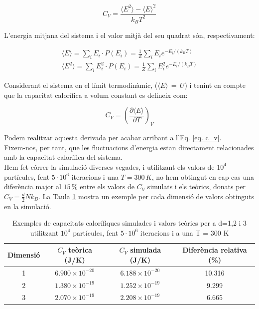 \documentclass{article}
\begin{document}
	\begin{equation}
		C_V = \frac{\langle E^2 \rangle - \langle E \rangle^2}{k_B T^2}
		\label{eq. c_v}
	\end{equation}
	
	\noindent L'energia mitjana del sistema i el valor mitjà del seu quadrat són, respectivament:
	
	\begin{gather}
		\langle E \rangle = \sum_i E_i \cdot P(E_i)
		= \frac{1}{Z} \sum_i E_i e^{-E_i / (k_B T)}
		\\
		\langle E^2 \rangle = \sum_i E_i^2 \cdot P(E_i)
		= \frac{1}{Z} \sum_i E_i^2 e^{-E_i / (k_B T)}
	\end{gather}
	
	\noindent Considerant el sistema en el límit termodinàmic, ($\langle E \rangle  \, = \, U$) i tenint en compte que la capacitat calorífica a volum constant es defineix com:
	
	\begin{equation}
		C_V = \left( \frac{\partial \langle E \rangle}{\partial T} \right)_V
	\end{equation}
	
	\noindent Podem realitzar aquesta derivada per acabar arribant a l'Eq. \eqref{eq. c_v}.
	\\
	Fixem-nos, per tant, que les fluctuacions d'energia estan directament relacionades amb la capacitat calorífica del sistema.
	\\
	
	\noindent Hem fet córrer la simulació diverses vegades, i utilitzant els valors de $10^4$ partícules, fent $5 \cdot 10^6$ iteracions i una $T =  300 \, K$, no hem obtingut en cap cas una diferència major al $15 \, \%$ entre els valors de $C_V$ simulats i els teòrics, donats per $C_V = \frac{d}{2}Nk_B$. La Taula \ref{taula_comparacio} mostra un exemple per cada dimensió de valors obtinguts en la simulació.
	
	\begin{table}[h!]
		\centering
		\begin{tabular}{|c|c|c|c|}
			\hline
			\textbf{Dimensió} & \textbf{$C_V$ teòrica (J/K)} & \textbf{$C_V$ simulada (J/K)} & \textbf{Diferència relativa (\%)} \\ \hline
			1 & $6.900 \times 10^{-20}$ & $6.188 \times 10^{-20}$ & 10.316 \\ \hline
			2 & $1.380 \times 10^{-19}$ & $1.252 \times 10^{-19}$ & 9.299 \\ \hline
			3 & $2.070 \times 10^{-19}$ & $2.208 \times 10^{-19}$ & 6.665 \\ \hline
		\end{tabular}
		\caption{Exemples de capacitats calorífiques simulades i valors teòrics per a d=1,2 i 3 utilitzant $10^4$ partícules, fent $5 \cdot 10^6$ iteracions i a una T = 300 K}
		\label{taula_comparacio}
	\end{table}
	
\end{document}

